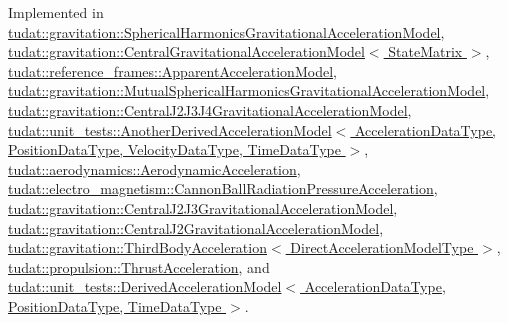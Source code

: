 Implemented in \hyperlink{classtudat_1_1gravitation_1_1SphericalHarmonicsGravitationalAccelerationModel_aae27d6f97cdbee300e8c532b2dc604b3}{tudat\+::gravitation\+::\+Spherical\+Harmonics\+Gravitational\+Acceleration\+Model}, \hyperlink{classtudat_1_1gravitation_1_1CentralGravitationalAccelerationModel_a1dc811759664e99193f323e02b0a4fe9}{tudat\+::gravitation\+::\+Central\+Gravitational\+Acceleration\+Model$<$ State\+Matrix $>$}, \hyperlink{classtudat_1_1reference__frames_1_1ApparentAccelerationModel_aa5c72a891752917421efb970407b2517}{tudat\+::reference\+\_\+frames\+::\+Apparent\+Acceleration\+Model}, \hyperlink{classtudat_1_1gravitation_1_1MutualSphericalHarmonicsGravitationalAccelerationModel_a9e317eb00b45c6890cdfc6b155b68175}{tudat\+::gravitation\+::\+Mutual\+Spherical\+Harmonics\+Gravitational\+Acceleration\+Model}, \hyperlink{classtudat_1_1gravitation_1_1CentralJ2J3J4GravitationalAccelerationModel_a5a8e57485fff4546caec93841a947406}{tudat\+::gravitation\+::\+Central\+J2\+J3\+J4\+Gravitational\+Acceleration\+Model}, \hyperlink{classtudat_1_1unit__tests_1_1AnotherDerivedAccelerationModel_ab025d414ca6b01e768198e2ab1f9c9d0}{tudat\+::unit\+\_\+tests\+::\+Another\+Derived\+Acceleration\+Model$<$ Acceleration\+Data\+Type, Position\+Data\+Type, Velocity\+Data\+Type, Time\+Data\+Type $>$}, \hyperlink{classtudat_1_1aerodynamics_1_1AerodynamicAcceleration_aca8adefed3eede69b980e46d045f46eb}{tudat\+::aerodynamics\+::\+Aerodynamic\+Acceleration}, \hyperlink{classtudat_1_1electro__magnetism_1_1CannonBallRadiationPressureAcceleration_a4fb5ecf9b9b5f3c1170df2a1f3a62043}{tudat\+::electro\+\_\+magnetism\+::\+Cannon\+Ball\+Radiation\+Pressure\+Acceleration}, \hyperlink{classtudat_1_1gravitation_1_1CentralJ2J3GravitationalAccelerationModel_a5b067a8787c813b6b08a5b83a3f415f9}{tudat\+::gravitation\+::\+Central\+J2\+J3\+Gravitational\+Acceleration\+Model}, \hyperlink{classtudat_1_1gravitation_1_1CentralJ2GravitationalAccelerationModel_abd75fb71f44ab8dd56edfcf9458c78eb}{tudat\+::gravitation\+::\+Central\+J2\+Gravitational\+Acceleration\+Model}, \hyperlink{classtudat_1_1gravitation_1_1ThirdBodyAcceleration_a595cb6cbc9e5d930be8394ec8b157dbb}{tudat\+::gravitation\+::\+Third\+Body\+Acceleration$<$ Direct\+Acceleration\+Model\+Type $>$}, \hyperlink{classtudat_1_1propulsion_1_1ThrustAcceleration_a85c999d6b3fc6b093e6990e2997918f6}{tudat\+::propulsion\+::\+Thrust\+Acceleration}, and \hyperlink{classtudat_1_1unit__tests_1_1DerivedAccelerationModel_a18a9f073e9f83d021d94b9df8144d253}{tudat\+::unit\+\_\+tests\+::\+Derived\+Acceleration\+Model$<$ Acceleration\+Data\+Type, Position\+Data\+Type, Time\+Data\+Type $>$}.

